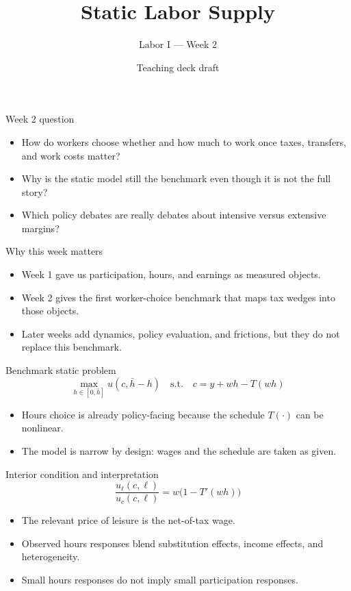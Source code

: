 \documentclass[aspectratio=169,11pt]{beamer}
\title{Static Labor Supply}
\subtitle{Labor I --- Week 2}
\author{Teaching deck draft}
\date{}
\begin{document}
\begin{frame}
  \titlepage
\end{frame}

\begin{frame}{Week 2 question}
\begin{itemize}
    \item How do workers choose whether and how much to work once taxes, transfers, and work costs matter?
    \item Why is the static model still the benchmark even though it is not the full story?
    \item Which policy debates are really debates about intensive versus extensive margins?
\end{itemize}
\end{frame}

\begin{frame}{Why this week matters}
\begin{itemize}
    \item Week 1 gave us participation, hours, and earnings as measured objects.
    \item Week 2 gives the first worker-choice benchmark that maps tax wedges into those objects.
    \item Later weeks add dynamics, policy evaluation, and frictions, but they do not replace this benchmark.
\end{itemize}
\end{frame}

\begin{frame}{Benchmark static problem}
\[
\max_{h \in [0,\bar h]} u(c,\bar h-h)
\quad \text{s.t.} \quad c = y + wh - T(wh)
\]

\begin{itemize}
    \item Hours choice is already policy-facing because the schedule \(T(\cdot)\) can be nonlinear.
    \item The model is narrow by design: wages and the schedule are taken as given.
\end{itemize}
\end{frame}

\begin{frame}{Interior condition and interpretation}
\[
\frac{u_{\ell}(c,\ell)}{u_c(c,\ell)} = w\bigl(1-T'(wh)\bigr)
\]

\begin{itemize}
    \item The relevant price of leisure is the net-of-tax wage.
    \item Observed hours responses blend substitution effects, income effects, and heterogeneity.
    \item Small hours responses do not imply small participation responses.
\end{itemize}
\end{frame}
\end{document}

